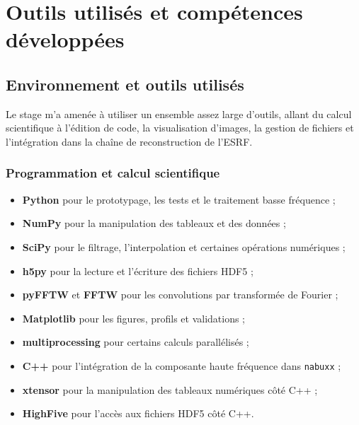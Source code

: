 \documentclass[11pt,a4paper]{report}
\begin{document}
\chapter{Outils utilisés et compétences développées}

\section{Environnement et outils utilisés}

Le stage m'a amenée à utiliser un ensemble assez large d'outils, allant du
calcul scientifique à l'édition de code, la visualisation d'images, la gestion
de fichiers et l'intégration dans la chaîne de reconstruction de l'ESRF.

\subsection{Programmation et calcul scientifique}

\begin{itemize}
    \item \textbf{Python} pour le prototypage, les tests et le traitement
    basse fréquence ;
    
    \item \textbf{NumPy} pour la manipulation des tableaux et des données ;
    
    \item \textbf{SciPy} pour le filtrage, l'interpolation et certaines
    opérations numériques ;
    
    \item \textbf{h5py} pour la lecture et l'écriture des fichiers HDF5 ;
    
    \item \textbf{pyFFTW} et \textbf{FFTW} pour les convolutions par
    transformée de Fourier ;
    
    \item \textbf{Matplotlib} pour les figures, profils et validations ;
    
    \item \textbf{multiprocessing} pour certains calculs parallélisés ;
    
    \item \textbf{C++} pour l'intégration de la composante haute fréquence
    dans \texttt{nabuxx} ;
    
    \item \textbf{xtensor} pour la manipulation des tableaux numériques
    côté C++ ;
    
    \item \textbf{HighFive} pour l'accès aux fichiers HDF5 côté C++.
\end{itemize}
\end{document}
